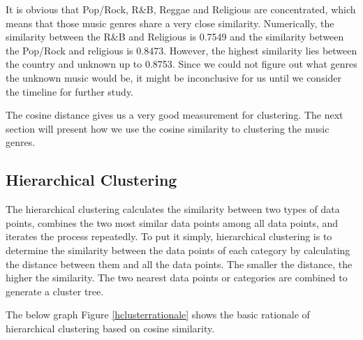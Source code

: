 \documentclass[12pt]{article}
\begin{document}
It is obvious that Pop/Rock, R\&B, Reggae and Religious are concentrated, which means that those music genres share a very close similarity. Numerically, the similarity between the R\&B and Religious is 0.7549 and the similarity between the Pop/Rock and religious is 0.8473. However, the highest similarity lies between the country and unknown up to 0.8753. Since we could not figure out what genres the unknown music would be, it might be inconclusive for us until we consider the timeline for further study.

The cosine distance gives us a very good measurement for clustering. The next section will present how we use the cosine similarity to clustering the music genres.
\subsection{Hierarchical Clustering}
The hierarchical clustering calculates the similarity between two types of data points, combines the two most similar data points among all data points, and iterates the process repeatedly. To put it simply, hierarchical clustering is to determine the similarity between the data points of each category by calculating the distance between them and all the data points. The smaller the distance, the higher the similarity. The two nearest data points or categories are combined to generate a cluster tree.

The below graph Figure \ref{hclusterrationale} shows the basic rationale of hierarchical clustering based on cosine similarity.
\end{document}

